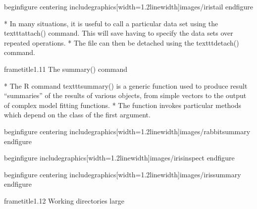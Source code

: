  		begin{figure}
 			centering
 			includegraphics[width=1.2linewidth]{images/iristail}     
 		end{figure}
 	   
 	
 		
 			         * In many situations, it is useful to call a particular data set using the texttt{attach()} command. This
 			will save having to specify the data sets over repeated operations. 
 			         * The file can then be detached
 			using the texttt{detach()} command.
 		
 		
 		
 		
 	
 	
 		frametitle{1.11 The summary() command}
 		
 		
 		         * The R command texttt{summary()} is a generic function used to produce result “summaries” of the
 		results of various objects, from simple vectors to the output of complex model fitting functions.
 		         * The function invokes particular methods which depend on the class of the first argument.
 		
 	
 	
 		begin{figure}
 			centering
 			includegraphics[width=1.2linewidth]{images/rabbitsummary}   
 		end{figure}
 	 
 	
 	
 		begin{figure}  
 			includegraphics[width=1.2linewidth]{images/irisinspect}     
 		end{figure}
 	   
 	
 		begin{figure}
 			centering
 			includegraphics[width=1.2linewidth]{images/irissummary}
 		end{figure}
 	   
 	
 	
 	
 	
 	
 		frametitle{1.12 Working directories}
 		large
 		
